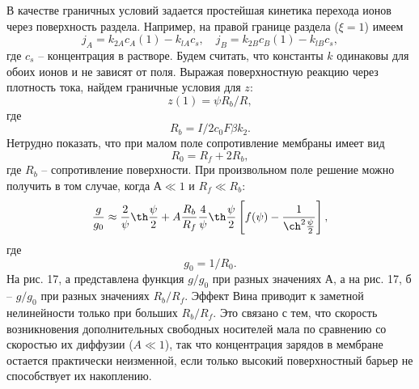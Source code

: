 В качестве граничных условий задается простейшая кинетика перехода ионов через
поверхность раздела. Например, на правой границе раздела (\( \xi = 1 \)) имеем
\begin{equation}
    j_A = k_{2A}c_A(1) - k_{lA}c_s,\quad j_B = k_{2B}c_B (1) - k_{lB}c_s,
\end{equation}
где \( c_s \) -- концентрация в растворе. Будем считать, что константы \( k \)
одинаковы для обоих ионов и не зависят от поля. Выражая поверхностную реакцию
через плотность тока, найдем граничные условия для \( z \):
\begin{equation}
    z(1) = \psi R_b / R,
\end{equation}
где
\[
    R_b = I/2c_0F\beta k_2.
\]
Нетрудно показать, что при малом поле сопротивление мембраны имеет вид
\begin{equation}
    R_0 = R_f + 2R_b,
\end{equation}
где \( R_b \) -- сопротивление поверхности. При произвольном поле решение можно
получить в том случае, когда \( А\ll1 \) и \( R_f \ll R_b \):
\begin{equation}
    \frac{g}{g_0} \approx \frac{2}{\psi}\th\frac{\psi}{2} +
    A\frac{R_b}{R_f}\frac{4}{\psi}\th\frac{\psi}{2}
    \left[f(\psi) - \frac{1}{\ch^2\frac{\psi}{2}}\right],
\end{equation}
где
\[
    g_0 = 1/R_0.
\]
На рис. 17, а представлена функция \( g/g_0 \) при разных значениях А, а на
рис. 17, б -- \( g/g_0 \) при разных значениях \( R_b/R_f \). Эффект Вина
приводит к заметной нелинейности только при больших \( R_b/R_f \). Это связано
с тем, что скорость возникновения дополнительных свободных носителей мала по
сравнению со скоростью их диффузии (\( A\ll1 \)), так что концентрация зарядов
в мембране остается практически неизменной, если только высокий поверхностный
барьер не способствует их накоплению.
